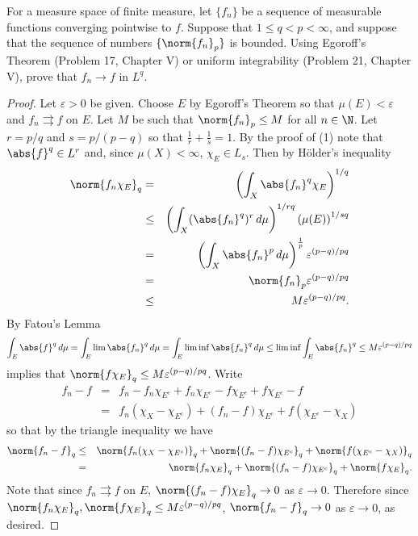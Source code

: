 \documentclass[12pt]{amsart}
\begin{document}
\newpage

\begin{thm}[p. 437, Problem 3]\label{ex4}
  For a measure space of finite measure, let $\{f_n\}$ be a sequence of measurable functions converging pointwise to $f$.
  Suppose that $1 \leq q < p < \infty$, and suppose that the sequence of numbers $\{\norm{f_n}_p\}$ is bounded.
  Using Egoroff's Theorem (Problem 17, Chapter V) or uniform integrability (Problem 21, Chapter V), prove that $f_n \rightarrow f$ in $L^q$.
  
  \begin{proof}
    Let $\varepsilon > 0$ be given.
    Choose $E$ by Egoroff's Theorem so that $\mu(E) < \varepsilon$ and $f_n \rightrightarrows f$ on $E$.
    Let $M$ be such that $\norm{f_n}_p \leq M$ for all $n \in \N$.
    Let $r = p/q$ and $s = p/(p - q)$ so that $\frac{1}{r} + \frac{1}{s} = 1$.
    By the proof of (1) note that $\abs{f}^q \in L^r$ and, since $\mu(X) < \infty$, $\chi_E \in L_s$.
    Then by H\"older's inequality
    \begin{eqnarray*}
      \norm{f_n\chi_E}_q &=& \left(\int_X \abs{f_n}^q \chi_E\right)^{1/q}\\
      &\leq& \left(\int_X (\abs{f_n}^q)^r\, d\mu\right)^{1/rq}\left( \mu(E) \right)^{1/sq}\\
      &=& \left(\int_X \abs{f_n}^p\, d\mu\right)^\frac{1}{p} \varepsilon^{(p-q)/pq}\\
      &=& \norm{f_n}_p\varepsilon^{(p-q)/pq}\\
      &\leq& M\varepsilon^{(p-q)/pq}.
    \end{eqnarray*}
    By Fatou's Lemma 
    $$\int_E \abs{f}^q\, d\mu = \int_E \lim \abs{f_n}^q\, d\mu = \int_E \liminf \abs{f_n}^q\, d\mu \leq \liminf \int_E \abs{f_n}^q \leq M\varepsilon^{(p-q)/pq}$$
    implies that $\norm{f \chi_E}_q \leq M\varepsilon^{(p-q)/pq}$.
    Write 
    \begin{eqnarray*}
      f_n - f &=& f_n - f_n\chi_{E^c} + f_n\chi_{E^c} - f\chi_{E^c} + f\chi_{E^c} - f\\
      &=& f_n(\chi_X - \chi_{E^c}) + (f_n - f)\chi_{E^c} + f(\chi_{E^c} - \chi_X)
    \end{eqnarray*}
    so that by the triangle inequality we have
    \begin{eqnarray*}
     \norm{f_n - f}_q &\leq& \norm{f_n(\chi_X - \chi_{E^c})}_q + \norm{(f_n - f)\chi_{E^c}}_q + \norm{f(\chi_{E^c} - \chi_X)}_q\\
     &=& \norm{f_n\chi_E}_q + \norm{(f_n - f)\chi_{E^c}}_q + \norm{f\chi_E}_q.
    \end{eqnarray*}
    Note that since $f_n \rightrightarrows f$ on $E$, $\norm{(f_n - f)\chi_E}_q \rightarrow 0$ as $\varepsilon \rightarrow 0$.
    Therefore since $\norm{f_n\chi_E}_q, \norm{f\chi_E}_q \leq M\varepsilon^{(p-q)/pq}$, $\norm{f_n - f}_q \rightarrow 0$ as $\varepsilon \rightarrow 0$, as desired.
  \end{proof}
\end{thm}
\end{document}

